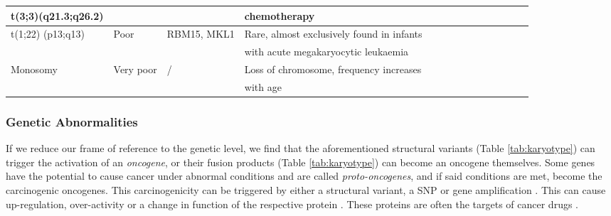 \begin{landscape}
\begin{table}[h]
\begin{tabular}{lllllllllllll}
        t(3;3)(q21.3;q26.2) & ~ & ~ & chemotherapy & ~ & ~ \\ \hline
        t(1;22) (p13;q13) & Poor & RBM15, MKL1 & Rare, almost exclusively found in infants   & \cite{carroll1991t} & ~ \\ 
        ~ & ~ & ~ &  with acute megakaryocytic leukaemia & \cite{bernstein2000nineteen} & ~ \\ \hline
        Monosomy  & Very poor & / & Loss of chromosome, frequency increases & \cite{breems2008monosomal} & ~ \\ 
        ~ & ~ & ~ &  with age &   & ~ \\ \bottomrule
    \end{tabular}
\end{table}
\end{landscape}





\subsubsection{Genetic Abnormalities}

If we reduce our frame of reference to the genetic level, we find that the aforementioned structural variants (Table \ref{tab:karyotype}) can trigger the activation of an \textit{oncogene}, or their fusion products (Table \ref{tab:karyotype}) can become an oncogene themselves. Some genes have the potential to cause cancer under abnormal conditions and are called \textit{proto-oncogenes}, and if said conditions are met, become the carcinogenic oncogenes. This carcinogenicity can be triggered by either a structural variant, a \ac{SNP} or gene amplification \citep{tabin1982mechanism}. This can cause up-regulation, over-activity or a change in function of the respective protein \citep{tabin1982mechanism}. These proteins are often the targets of cancer drugs \citep{liu2004new}.

